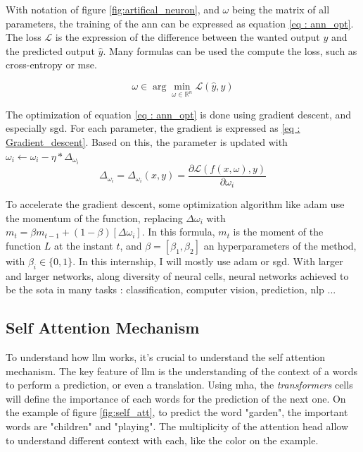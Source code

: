 With notation of figure \ref{fig:artifical_neuron}, and $\omega$ being the matrix of all parameters, the training of the \acrshort{ann} can be expressed as equation \ref{eq : ann_opt}. The loss $\mathcal L$ is the expression of the difference between the wanted output $y$ and the predicted output $\hat y$. Many formulas can be used the compute the loss, such as cross-entropy \cite{X} or \acrfull{mse}.

\begin{equation}
    \omega \in \arg \min_{\omega \in \mathbb R^n} \mathcal L(\hat{y},y)
    \label{eq : ann_opt}
\end{equation}

The optimization of equation \ref{eq : ann_opt} is done using gradient descent, and especially \acrfull{sgd}. For each parameter, the gradient is expressed as \ref{eq : Gradient_descent}. Based on this, the parameter is updated with $\omega_{i} \gets \omega_i - \eta * \Delta_{\omega_i}$
\begin{equation}
    \Delta_{\omega_i}=\Delta_{\omega_i}(x,y)=\frac{\partial \mathcal L(f(x,\omega),y)}{\partial \omega_i}
\label{eq : Gradient_descent}
\end{equation}

To accelerate the gradient descent, some optimization algorithm like \acrfull{adam} \cite{kingma_adam_2017} use the momentum of the function, replacing $\Delta \omega_i$ with $m_t = \beta m_{t-1}+(1-\beta)[\Delta \omega_i]$. In this formula, $m_t$ is the moment of the function $L$ at the instant $t$, and $\beta = [\beta_1, \beta_2]$ an hyperparameters of the method, with $\beta_i \in \{0,1\}$. In this internship, I will mostly use \acrshort{adam} or \acrshort{sgd}. 
With larger and larger networks, along diversity of neural cells, neural networks achieved to be the \acrfull{sota} in many tasks : classification, computer vision, prediction, \acrshort{nlp} ...
\subsection{Self Attention Mechanism}
\label{sec:self_att}


To understand how \acrshort{llm} works, it's crucial to understand the self attention mechanism. The key feature of \acrshort{llm} is the understanding of the context of a words to perform a prediction, or even a translation. Using \acrfull{mha}, the \textit{transformers} cells will define the importance of each words for the prediction of the next one. On the example of figure \ref{fig:self_att}, to predict the word "garden", the important words are "children" and "playing". The multiplicity of the attention head allow to understand different context with each, like the color on the example. 

